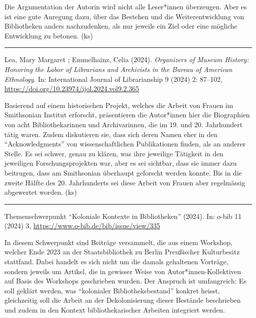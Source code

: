 \documentclass[a4paper,
fontsize=11pt,
oneside,
numbers=noperiodatend,
parskip=half-,
bibliography=totoc,
final
]{scrartcl}
\begin{document}
Die Argumentation der Autorin wird nicht alle Leser*innen überzeugen.
Aber es ist eine gute Anregung dazu, über das Bestehen und die
Weiterentwicklung von Bibliotheken anders nachzudenken, als nur jeweils
ein Ziel oder eine mögliche Entwicklung zu betonen. (ks)

\begin{center}\rule{0.5\linewidth}{0.5pt}\end{center}

Lea, Mary Margaret ; Emmelhainz, Celia (2024). \emph{Organizers of
Museum History: Honoring the Labor of Librarians and Archivists in the
Bureau of American Ethnology}. In: International Journal of
Librarianship 9 (2024) 2: 87--102,
\url{https://doi.org/10.23974/ijol.2024.vol9.2.365}

Basierend auf einem historischen Projekt, welches die Arbeit von Frauen
im Smithsonian Institut erforscht, präsentieren die Autor*innen hier die
Biographien von acht Bibliothekarinnen und Archivarinnen, die im 19. und
20. Jahrhundert tätig waren. Zudem diskutieren sie, dass sich deren
Namen eher in den ``Acknowledgments'' von wissenschaftlichen
Publikationen finden, als an anderer Stelle. Es sei schwer, genau zu
klären, was ihre jeweilige Tätigkeit in den jeweiligen
Forschungsprojekten war, aber es sei sichtbar, dass sie immer dazu
beitrugen, dass am Smithsonian überhaupt geforscht werden konnte. Bis in
die zweite Hälfte des 20. Jahrhunderts sei diese Arbeit von Frauen aber
regelmässig abgewertet worden. (ks)

\begin{center}\rule{0.5\linewidth}{0.5pt}\end{center}

Themenschwerpunkt ``Koloniale Kontexte in Bibliotheken'' (2024). In:
o-bib 11 (2024) 3, \url{https://www.o-bib.de/bib/issue/view/335}

In diesem Schwerpunkt sind Beiträge versammelt, die aus einem Workshop,
welcher Ende 2023 an der Staatsbibliothek zu Berlin Preußischer
Kulturbesitz stattfand. Dabei handelt es sich nicht um die damals
gehaltenen Vorträge, sondern jeweils um Artikel, die in gewisser Weise
von Autor*innen-Kollektiven auf Basis des Workshops geschrieben wurden.
Der Anspruch ist umfangreich: Es soll geklärt werden, was ``kolonialer
Bibliotheksbestand'' konkret heisst, gleichzeitig soll die Arbeit an der
Dekolonisierung dieser Bestände beschrieben und zudem in den Kontext
bibliothekarischer Arbeiten integriert werden.
\end{document}
